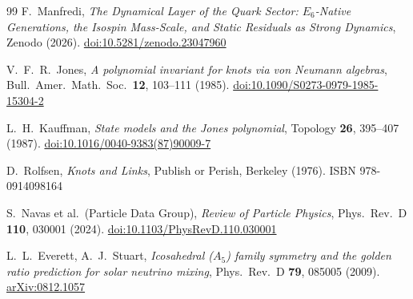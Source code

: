 \documentclass[11pt,a4paper]{article}
\theoremstyle{definition}\newtheorem{definition}[theorem]{Definition}
\theoremstyle{remark}
\begin{document}
\begin{thebibliography}{99}
F.~Manfredi,
\textit{The Dynamical Layer of the Quark Sector: $E_6$-Native
Generations, the Isospin Mass-Scale, and Static Residuals as Strong
Dynamics},
Zenodo (2026).
\href{https://doi.org/10.5281/zenodo.23047960}{doi:10.5281/zenodo.23047960}

V.~F.~R.~Jones,
\textit{A polynomial invariant for knots via von Neumann algebras},
Bull.\ Amer.\ Math.\ Soc.\ \textbf{12}, 103--111 (1985).
\href{https://doi.org/10.1090/S0273-0979-1985-15304-2}{doi:10.1090/S0273-0979-1985-15304-2}

L.~H.~Kauffman,
\textit{State models and the Jones polynomial},
Topology \textbf{26}, 395--407 (1987).
\href{https://doi.org/10.1016/0040-9383(87)90009-7}{doi:10.1016/0040-9383(87)90009-7}

D.~Rolfsen,
\textit{Knots and Links},
Publish or Perish, Berkeley (1976).
ISBN 978-0914098164

S.~Navas et al.\ (Particle Data Group),
\textit{Review of Particle Physics},
Phys.\ Rev.\ D \textbf{110}, 030001 (2024).
\href{https://doi.org/10.1103/PhysRevD.110.030001}{doi:10.1103/PhysRevD.110.030001}

L.~L.~Everett, A.~J.~Stuart,
\textit{Icosahedral ($A_5$) family symmetry and the golden ratio
prediction for solar neutrino mixing},
Phys.\ Rev.\ D \textbf{79}, 085005 (2009).
\href{https://arxiv.org/abs/0812.1057}{arXiv:0812.1057}

\end{thebibliography}
\end{document}
